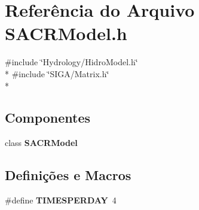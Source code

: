 \section{Referência do Arquivo S\+A\+C\+R\+Model.\+h}
\label{_s_a_c_r_model_8h}
{\ttfamily \#include \char`\"{}Hydrology/\+Hidro\+Model.\+h\char`\"{}}\\*
{\ttfamily \#include \char`\"{}S\+I\+G\+A/\+Matrix.\+h\char`\"{}}\\*
\subsection*{Componentes}
\begin{DoxyCompactItemize}
\item 
class {\bf S\+A\+C\+R\+Model}
\end{DoxyCompactItemize}
\subsection*{Definições e Macros}
\begin{DoxyCompactItemize}
\item 
\#define {\bf T\+I\+M\+E\+S\+P\+E\+R\+D\+AY}~4
\end{DoxyCompactItemize}
